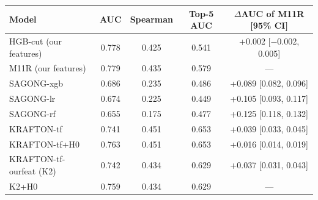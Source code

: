 \begin{tabular}{@{}l c c c c@{}}
\toprule
Model & AUC & Spearman & Top-5 AUC & $\Delta$AUC of M11R [95\% CI] \\
\midrule
HGB-cut (our features) & 0.778 & 0.425 & 0.541 & +0.002 [$-$0.002, 0.005] \\
M11R (our features) & 0.779 & 0.435 & 0.579 & --- \\
\midrule
SAGONG-xgb & 0.686 & 0.235 & 0.486 & +0.089 [0.082, 0.096] \\
SAGONG-lr & 0.674 & 0.225 & 0.449 & +0.105 [0.093, 0.117] \\
SAGONG-rf & 0.655 & 0.175 & 0.477 & +0.125 [0.118, 0.132] \\
KRAFTON-tf & 0.741 & 0.451 & 0.653 & +0.039 [0.033, 0.045] \\
KRAFTON-tf+H0 & 0.763 & 0.451 & 0.653 & +0.016 [0.014, 0.019] \\
KRAFTON-tf-ourfeat (K2) & 0.742 & 0.434 & 0.629 & +0.037 [0.031, 0.043] \\
K2+H0 & 0.759 & 0.434 & 0.629 & --- \\
\bottomrule
\end{tabular}
